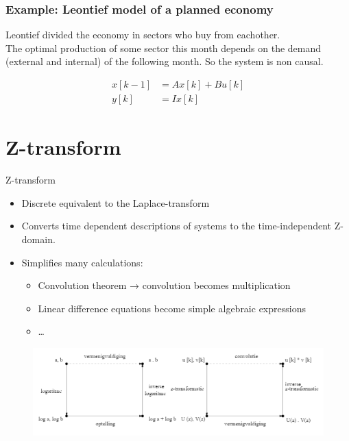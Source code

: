 \begin{frame}
	\frametitle{Example: Leontief model of a planned economy}
	Leontief divided the economy in sectors who buy from eachother.\\
	The optimal production of some sector this month depends on the demand (external and internal) of the following month. So the system is non causal.\\
	\begin{center}
		\begin{align*}
			x[k-1] &= A x[k] + B u[k]\\
			y[k] &= I x[k]
		\end{align*}
	\end{center}	
\end{frame}

\section{Z-transform}
\begin{frame}{Z-transform}
	\begin{definition}
		\begin{itemize}
			\item Discrete equivalent to the Laplace-transform
			\item Converts time dependent descriptions of systems to the time-independent Z-domain.
			\item Simplifies many calculations:
			\begin{itemize}
				\item 	Convolution theorem → convolution becomes multiplication
				\item Linear difference equations become simple algebraic expressions
				\item \dots
			\end{itemize}
		\end{itemize}
	\end{definition}
\end{frame}
\begin{frame}
		\begin{figure}
			\centering
			\includegraphics[width=0.9\linewidth]{Images/discrete_time_systems_21}
		\end{figure}
		
\end{frame}
